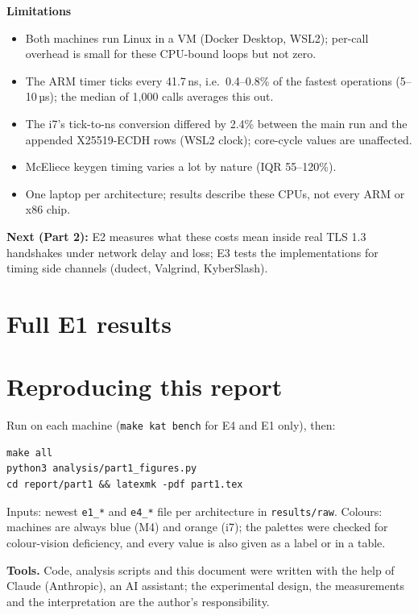 \documentclass[10.5pt,a4paper]{article}
\newcommand{\sect}[1]{\section{#1}}
\begin{document}
\textbf{Limitations}
\begin{itemize}
\item Both machines run Linux in a VM (Docker Desktop, WSL2); per-call overhead is small for these CPU-bound loops but not zero.
\item The ARM timer ticks every 41.7\,ns, i.e.\ 0.4–0.8\% of the fastest operations (5–10\,µs); the median of 1,000 calls averages this out.
\item The i7's tick-to-ns conversion differed by 2.4\% between the main run and the appended X25519-ECDH rows (WSL2 clock); core-cycle values are unaffected.
\item McEliece keygen timing varies a lot by nature (IQR 55–120\%).
\item One laptop per architecture; results describe these CPUs, not every ARM or x86 chip.
\end{itemize}

\textbf{Next (Part 2):} E2 measures what these costs mean inside real TLS 1.3 handshakes under network delay and loss; E3 tests the implementations for timing side channels (dudect, Valgrind, KyberSlash).

\appendix
\sect{Full E1 results}
\begin{table}[H]
\centering\scriptsize\setlength{\tabcolsep}{4pt}

\caption{Apple M4: medians per call, estimated core cycles, and the largest relative IQR of the three operations.}
\end{table}
\begin{table}[H]
\centering\scriptsize\setlength{\tabcolsep}{4pt}

\caption{Intel i7-1185G7, same columns.}
\end{table}

\sect{Reproducing this report}
Run on each machine (\texttt{make kat bench} for E4 and E1 only), then:
\begin{verbatim}
make all
python3 analysis/part1_figures.py
cd report/part1 && latexmk -pdf part1.tex
\end{verbatim}
Inputs: newest \texttt{e1\_*} and \texttt{e4\_*} file per architecture in \texttt{results/raw}. Colours: machines are always blue (M4) and orange (i7); the palettes were checked for colour-vision deficiency, and every value is also given as a label or in a table.

\textbf{Tools.} Code, analysis scripts and this document were written with the help of Claude (Anthropic), an AI assistant; the experimental design, the measurements and the interpretation are the author's responsibility.
\end{document}
